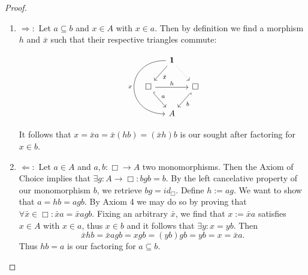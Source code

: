 \begin{proof}
\begin{enumerate} 
\item $\Rightarrow :$ Let $a \subseteq b$ and $x \in A$ with $x \in a$. Then by definition we find a morphism $h$ and $\bar{x}$ such that their respective triangles commute:

\begin{equation}
\begin{tikzcd}[column sep=small]
& \mathbf{1} \arrow[dl, "\bar{x}"] \arrow[dr, dotted] \arrow[dd, "x", bend right=90,looseness=2,swap]& \\
\Box \arrow[rr, "h"] \arrow[dr, "a", hook] &     & \Box \arrow[dl, "b", hook] \\
& A
\end{tikzcd}
\end{equation} \newline

It follows that $x = \bar{x}a = \bar{x}(hb) = (\bar{x}h)b$ is our sought after factoring for $x \in b$.

\item $\Leftarrow :$ Let $a \in A$ and $a,b: \Box \longrightarrow A$ two monomorphisms. Then the Axiom of Choice implies that $\exists g: A \longrightarrow \Box : bgb = b$. By the left cancelative property of our monomorphism $b$, we retrieve $bg = id_\Box$. Define $h := ag$. We want to show that $a = hb = agb$. By Axiom 4 we may do so by proving that $\forall \bar{x} \in \Box: \bar{x}a = \bar{x}agb$. Fixing an arbitrary $\bar{x}$, we find that $x := \bar{x}a$ satisfies $x \in A$ with $x \in a$, thus $x \in b$ and it follows that $\exists y : x = yb$. Then
\begin{equation*}
\bar{x}hb = \bar{x}agb = xgb = (yb)gb = yb = x = \bar{x}a.
\end{equation*}
Thus $hb = a$ is our factoring for $a \subseteq b$. 
\end{enumerate}
\end{proof}





\clearpage


